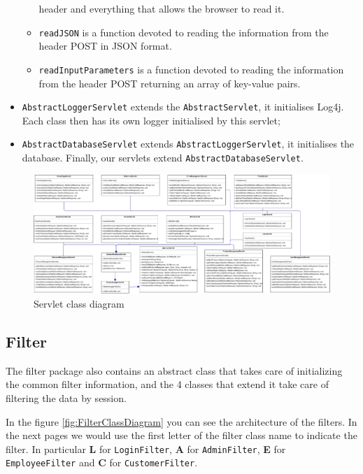 \begin{itemize}
\begin{itemize}
        header and everything that allows the browser to read it.
        \item \texttt{readJSON}  is a function devoted to reading the information 
        from the header POST in JSON format.
        \item \texttt{readInputParameters} is a function devoted to reading the 
        information from the header POST returning an array of key-value pairs.
    \end{itemize}
    \item \texttt{AbstractLoggerServlet} extends the \texttt{AbstractServlet}, it initialises Log4j. 
    Each class then has its own logger initialised by this servlet;
    \item \texttt{AbstractDatabaseServlet} extends \texttt{AbstractLoggerServlet}, it initialises the database.
    Finally, our servlets extend \texttt{AbstractDatabaseServlet}.
\end{itemize}    


\begin{figure}[H]
    \includegraphics[width=\textwidth,height=\textheight,keepaspectratio]{Schemas/servlet.drawio.pdf}
    \caption{Servlet class diagram}
    \label{fig:ServletClassDiagram}
\end{figure}

\subsection*{Filter}

    
The filter package also contains an abstract class that takes care of 
initializing the common filter information, and the 4 classes that 
extend it take care of filtering the data by session.

In the figure \ref{fig:FilterClassDiagram} you can see the architecture 
of the filters. In the next pages we would use
the first letter of the filter class name to indicate the filter.
In particular \textbf{L} for \texttt{LoginFilter}, 
\textbf{A} for \texttt{AdminFilter}, \textbf{E} for 
\texttt{EmployeeFilter} and \textbf{C} for \texttt{CustomerFilter}.

